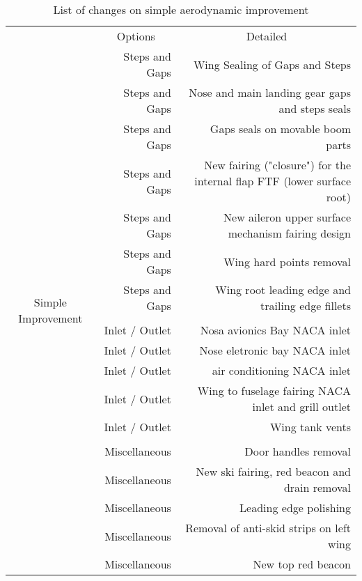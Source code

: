 \begin{table}[htbp]
  \centering
  \scriptsize
  \caption{List of changes on simple aerodynamic improvement}
    \begin{tabular}{crr}
    \toprule
    \multirow{2}[2]{*}{} & \multicolumn{1}{c}{\multirow{2}[2]{*}{Options}} & \multicolumn{1}{c}{\multirow{2}[2]{*}{Detailed}} \\

          & \multicolumn{1}{c}{} & \multicolumn{1}{c}{} \\
      \midrule    
    \multirow{21}[42]{*}{Simple Improvement} & Steps and Gaps & Wing Sealing of Gaps and Steps \\
          & Steps and Gaps & Nose and main landing gear gaps and steps seals \\
          & Steps and Gaps & Gaps seals on movable boom parts \\
          & Steps and Gaps & New fairing ("closure") for the internal flap FTF (lower surface root) \\
          & Steps and Gaps & New aileron upper surface mechanism fairing design \\
          & Steps and Gaps & Wing hard points removal \\
          & Steps and Gaps & Wing root leading edge and trailing edge fillets \\
          &       &  \\
          & Inlet / Outlet & Nosa avionics Bay NACA inlet \\
          & Inlet / Outlet & Nose eletronic bay NACA inlet \\
          & Inlet / Outlet & air conditioning NACA inlet \\
          & Inlet / Outlet & Wing to fuselage fairing NACA inlet and grill outlet \\
          & Inlet / Outlet & Wing tank vents \\
          &       &  \\
          & Miscellaneous & Door handles removal \\
          & Miscellaneous & New ski fairing, red beacon and drain removal \\
          & Miscellaneous & Leading edge polishing \\
          & Miscellaneous & Removal of anti-skid strips on left wing \\
          & Miscellaneous & New top red beacon \\

\end{tabular}
\end{table}
